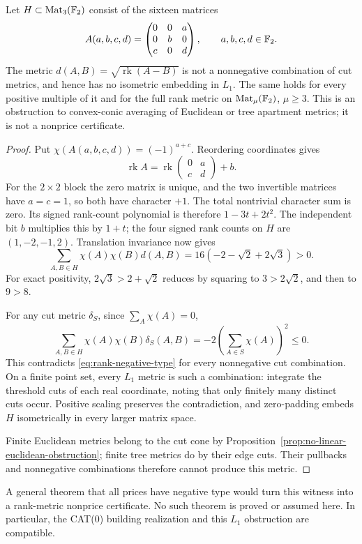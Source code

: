 \begin{proposition}\label{prop:rank-metric-not-lone}
Let \(H\subset\operatorname{Mat}_3(\mathbb F_2)\) consist of the sixteen matrices
\[
 A(a,b,c,d)=
 \begin{pmatrix}0&0&a\\0&b&0\\c&0&d\end{pmatrix},
 \qquad a,b,c,d\in\mathbb F_2.
\]
The metric \(d(A,B)=\sqrt{\operatorname{rk}(A-B)}\) is not a nonnegative
combination of cut metrics, and hence has no isometric embedding in
\(L_1\). The same holds for every positive multiple of it and for the
full rank metric on \(\operatorname{Mat}_\mu(\mathbb F_2)\), \(\mu\geq3\).
This is an obstruction to convex-conic averaging of Euclidean or tree
apartment metrics; it is not a nonprice certificate.
\end{proposition}
\begin{proof}
Put \(\chi(A(a,b,c,d))=(-1)^{a+c}\).  Reordering coordinates gives
\[
 \operatorname{rk}A
 =\operatorname{rk}\begin{pmatrix}0&a\\c&d\end{pmatrix}+b.
\]
For the \(2\times2\) block the zero matrix is unique, and the two
invertible matrices have \(a=c=1\), so both have character \(+1\).
The total nontrivial character sum is zero. Its signed rank-count
polynomial is therefore \(1-3t+2t^2\). The independent bit \(b\)
multiplies this by \(1+t\); the four signed rank counts on \(H\) are
\((1,-2,-1,2)\).
Translation invariance now gives
\begin{equation}\label{eq:rank-negative-type}
 \sum_{A,B\in H}\chi(A)\chi(B)d(A,B)
 =16(-2-\sqrt2+2\sqrt3)>0.
\end{equation}
For exact positivity, \(2\sqrt3>2+\sqrt2\) reduces by squaring to
\(3>2\sqrt2\), and then to \(9>8\).

For any cut metric \(\delta_S\), since \(\sum_A\chi(A)=0\),
\[
 \sum_{A,B\in H}\chi(A)\chi(B)\delta_S(A,B)
 =-2\left(\sum_{A\in S}\chi(A)\right)^2\leq0.
\]
This contradicts \eqref{eq:rank-negative-type} for every nonnegative
cut combination. On a finite point set, every \(L_1\) metric is such
a combination: integrate the threshold cuts of each real coordinate,
noting that only finitely many distinct cuts occur. Positive scaling
preserves the contradiction, and zero-padding embeds \(H\) isometrically
in every larger matrix space.

Finite Euclidean metrics belong to the cut cone by
Proposition~\ref{prop:no-linear-euclidean-obstruction}; finite tree
metrics do by their edge cuts. Their pullbacks and nonnegative
combinations therefore cannot produce this metric.
\end{proof}

A general theorem that all prices have negative type would turn this
witness into a rank-metric nonprice certificate. No such theorem is
proved or assumed here. In particular, the CAT(0) building realization
and this \(L_1\) obstruction are compatible.
